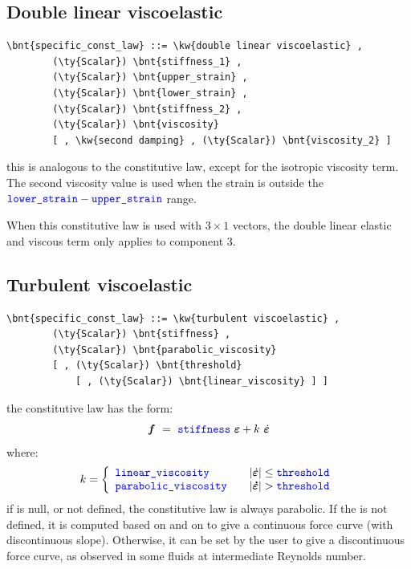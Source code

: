 \subsection{Double linear viscoelastic}
\begin{Verbatim}[commandchars=\\\{\}]
    \bnt{specific_const_law} ::= \kw{double linear viscoelastic} ,
        (\ty{Scalar}) \bnt{stiffness_1} ,
        (\ty{Scalar}) \bnt{upper_strain} ,
        (\ty{Scalar}) \bnt{lower_strain} ,
        (\ty{Scalar}) \bnt{stiffness_2} ,
        (\ty{Scalar}) \bnt{viscosity}
        [ , \kw{second damping} , (\ty{Scalar}) \bnt{viscosity_2} ]
\end{Verbatim}
this is analogous to the  constitutive law,
except for the isotropic viscosity term.
The second viscosity value is used when the strain is outside the
$\nt{lower\_strain} - \nt{upper\_strain}$ range.

When this constitutive law is used with $3 \times 1$ vectors, 
the double linear elastic and viscous term only applies to component 3.
  
\subsection{Turbulent viscoelastic}
\begin{Verbatim}[commandchars=\\\{\}]
    \bnt{specific_const_law} ::= \kw{turbulent viscoelastic} ,
        (\ty{Scalar}) \bnt{stiffness} ,
        (\ty{Scalar}) \bnt{parabolic_viscosity}
        [ , (\ty{Scalar}) \bnt{threshold}
            [ , (\ty{Scalar}) \bnt{linear_viscosity} ] ]
\end{Verbatim}
the constitutive law has the form:
\begin{displaymath}
    \T{f} \ = \ \nt{stiffness} \ \T{\varepsilon} + k \ \dot{\T{\varepsilon}}
\end{displaymath}
where:
\begin{displaymath}
    k = \lcubr{\matr{lcr}{
        \nt{linear\_viscosity} & & 
            \shbr{\dot{\T{\varepsilon}}} \leq \nt{threshold} \\
        \nt{parabolic\_viscosity} & &
            \shbr{\T{\dot{\varepsilon}}} > \nt{threshold}
    }}
\end{displaymath}
if  is null, or not defined, the constitutive law is always
parabolic. If the  is not defined, it is
computed based on  and on 
 to give a continuous force curve (with discontinuous slope).
Otherwise, it can be set by the user to give a discontinuous force curve,
as observed in some fluids at intermediate Reynolds number.

